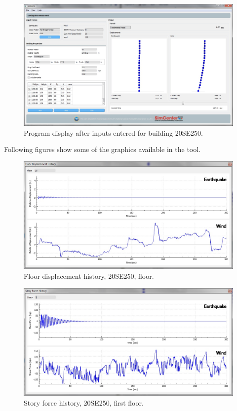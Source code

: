 \documentclass[onecolumn, fleqn]{article}
\begin{document}
\begin{figure}[H]
	\centering \includegraphics[width=0.9\linewidth]{20SE250_1.JPG}
	\caption{Program display after inputs entered for building 20SE250.}
\end{figure}
Following figures show some of the graphics available in the tool.
\begin{figure}[H]
	\centering \includegraphics[scale=0.35]{20SE250_fdh.JPG}
	\caption{Floor displacement history, 20SE250,  floor.}
\end{figure}
\begin{figure}[H]
	\centering \includegraphics[scale=0.35]{20SE250_sfh.JPG}
	\caption{Story force history, 20SE250, first floor.}
\end{figure}
\end{document}
